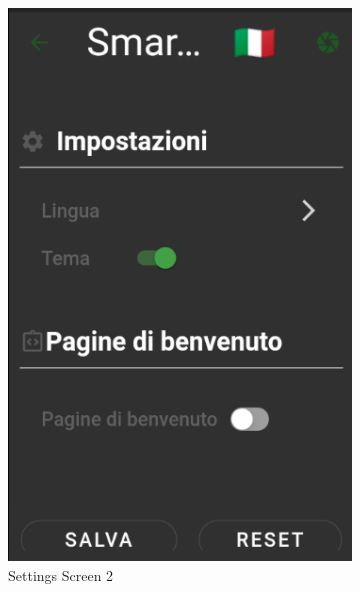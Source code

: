 \documentclass[a4paper,12pt]{report}
\begin{document}
\begin{figure}[H]
\begin{subfigure}{0.3\textwidth}
		\includegraphics[width=\textwidth]{./images/settings/settings_screen2.png}
		\caption{Settings Screen 2}
		\label{fig:settings2}
	\end{subfigure}
		\hfill
		\begin{subfigure}{0.3\textwidth}

\end{subfigure}
\end{figure}
\end{document}
